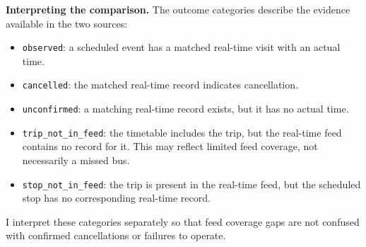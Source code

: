 \documentclass[11pt]{article}
\providecommand{\tightlist}{%
      \setlength{\itemsep}{0pt}\setlength{\parskip}{0pt}}
\begin{document}
    
    \textbf{Interpreting the comparison.} The outcome categories describe
the evidence available in the two sources:

\begin{itemize}
\tightlist
\item
  \texttt{observed}: a scheduled event has a matched real-time visit
  with an actual time.
\item
  \texttt{cancelled}: the matched real-time record indicates
  cancellation.
\item
  \texttt{unconfirmed}: a matching real-time record exists, but it has
  no actual time.
\item
  \texttt{trip\_not\_in\_feed}: the timetable includes the trip, but the
  real-time feed contains no record for it. This may reflect limited
  feed coverage, not necessarily a missed bus.
\item
  \texttt{stop\_not\_in\_feed}: the trip is present in the real-time
  feed, but the scheduled stop has no corresponding real-time record.
\end{itemize}

I interpret these categories separately so that feed coverage gaps are
not confused with confirmed cancellations or failures to operate.
\end{document}
